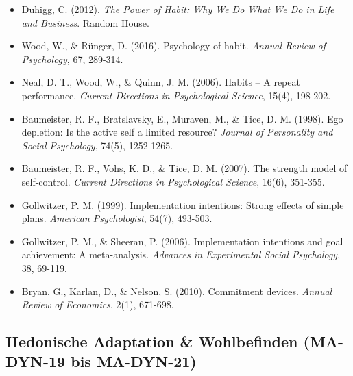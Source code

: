 \begin{itemize}[leftmargin=*]
    \item Duhigg, C. (2012). \textit{The Power of Habit: Why We Do What We Do in Life and Business}. Random House.
    \item Wood, W., \& Rünger, D. (2016). Psychology of habit. \textit{Annual Review of Psychology}, 67, 289-314.
    \item Neal, D. T., Wood, W., \& Quinn, J. M. (2006). Habits -- A repeat performance. \textit{Current Directions in Psychological Science}, 15(4), 198-202.
    \item Baumeister, R. F., Bratslavsky, E., Muraven, M., \& Tice, D. M. (1998). Ego depletion: Is the active self a limited resource? \textit{Journal of Personality and Social Psychology}, 74(5), 1252-1265.
    \item Baumeister, R. F., Vohs, K. D., \& Tice, D. M. (2007). The strength model of self-control. \textit{Current Directions in Psychological Science}, 16(6), 351-355.
    \item Gollwitzer, P. M. (1999). Implementation intentions: Strong effects of simple plans. \textit{American Psychologist}, 54(7), 493-503.
    \item Gollwitzer, P. M., \& Sheeran, P. (2006). Implementation intentions and goal achievement: A meta-analysis. \textit{Advances in Experimental Social Psychology}, 38, 69-119.
    \item Bryan, G., Karlan, D., \& Nelson, S. (2010). Commitment devices. \textit{Annual Review of Economics}, 2(1), 671-698.
\end{itemize}

\subsection*{Hedonische Adaptation \& Wohlbefinden (MA-DYN-19 bis MA-DYN-21)}

